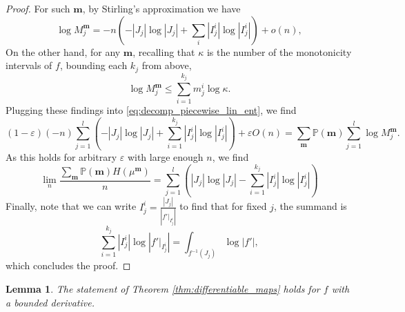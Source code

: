 \documentclass[11pt]{article}
\newtheorem{lemma}[theorem]{Lemma}
\theoremstyle{definition}
\begin{document}
\begin{proof}
    For such $\mathbf{m}$, by Stirling's approximation we have
    $$\log M_j^{\mathbf{m}}=-n\left(-|J_j|\log |J_j| + \sum_{i}|I_j^i|\log |I_j^i|\right)+o(n),$$
    On the other hand, for any $\mathbf{m}$, recalling that $\kappa$ is the number of the monotonicity intervals of $f$, bounding each $k_j$ from above,
    $$\log M_j^{\mathbf{m}}\leq \sum_{i=1}^{k_j}m_j^i \log \kappa.$$
    Plugging these findings into \eqref{eq:decomp_piecewise_lin_ent}, we find
    \begin{equation} \label{eq:decomp_piecewise_lin_ent2}
    (1-\varepsilon)(-n)\sum_{j=1}^{l}\left(-|J_j|\log |J_j| + \sum_{i=1}^{k_j}|I_j^i|\log |I_j^i|\right)+\varepsilon O(n)= \sum_{\mathbf{m}}\mathbb{P}(\mathbf{m})\sum_{j=1}^l\log M_j^{\mathbf{m}}.
    \end{equation}
    As this holds for arbitrary $\varepsilon$ with large enough $n$, we find
    $$\lim_n \frac{\sum_{\mathbf{m}}\mathbb{P}(\mathbf{m})H(\mu^{\mathbf{m}})}{n} = \sum_{j=1}^{l}\left(|J_j|\log |J_j| - \sum_{i=1}^{k_j}|I_j^i|\log |I_j^i|\right)$$
    Finally, note that we can write $I_j^i= \frac{|J_j|}{\left|f'|_{I_j^i}\right|}$ to find that for fixed $j$, the summand is
    $$\sum_{i=1}^{k_j}|I_j^i| \log \left|f'|_{I_j^i}\right|=\int_{f^{-1}(J_j)}\log |f'|,$$
    which concludes the proof.
\end{proof}

\begin{lemma} \label{lemma:diff_maps_bounded_derivative}
    The statement of Theorem \ref{thm:differentiable_maps} holds for $f$ with a bounded derivative.
\end{lemma}
\end{document}
